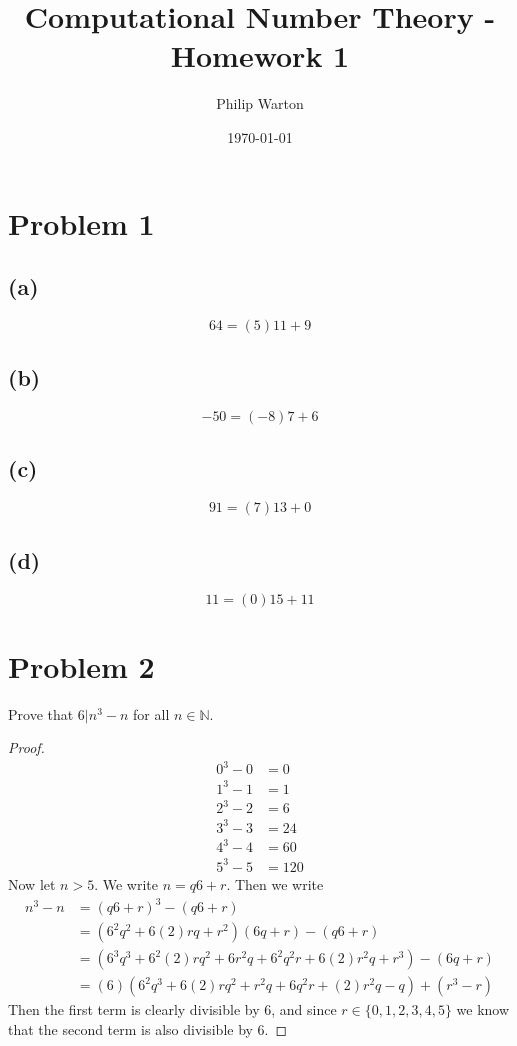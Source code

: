 \documentclass{article}
\theoremstyle{definition}
\begin{document}
\title{Computational Number Theory - Homework 1}
\author{Philip Warton}
\date{\today}
\maketitle
\section*{Problem 1}
\subsection*{(a)}
    \[
        64 = (5)11 + 9
    \]
\subsection*{(b)}
    \[
        -50 = (-8)7 + 6
    \]
\subsection*{(c)}
    \[
        91 = (7)13 + 0
    \]
\subsection*{(d)}
    \[
        11 = (0)15 + 11
    \]
\section*{Problem 2}
    Prove that $6 | n^3 - n$ for all $n \in \mathbb{N}$.
    \begin{proof}
        \begin{align*}
            0^3 - 0 & = 0 \\
            1^3 - 1 & = 1 \\
            2^3 - 2 & = 6 \\
            3^3 - 3 & = 24 \\
            4^3 - 4 & = 60 \\
            5^3 - 5 & = 120
        \end{align*}
        Now let $n > 5$. We write $n = q6 + r$.
        Then we write 
        \begin{align*}
            n^3 - n & = (q6 + r)^3 - (q6 + r) \\
            & = (6^2q^2 + 6(2)rq + r^2)(6q + r) - (q6 + r) \\
            & = (6^3q^3 + 6^2(2)rq^2 + 6r^2q + 6^2q^2r + 6(2)r^2q + r^3) - (6q + r) \\
            & = (6)(6^2q^3 + 6(2)rq^2 + r^2q + 6q^2r + (2)r^2q - q) + (r^3 - r)
        \end{align*}
        Then the first term is clearly divisible by $6$, and since $r \in \{0,1,2,3,4,5\}$ we know that the second term is also divisible by 6.
    \end{proof}
\end{document}
